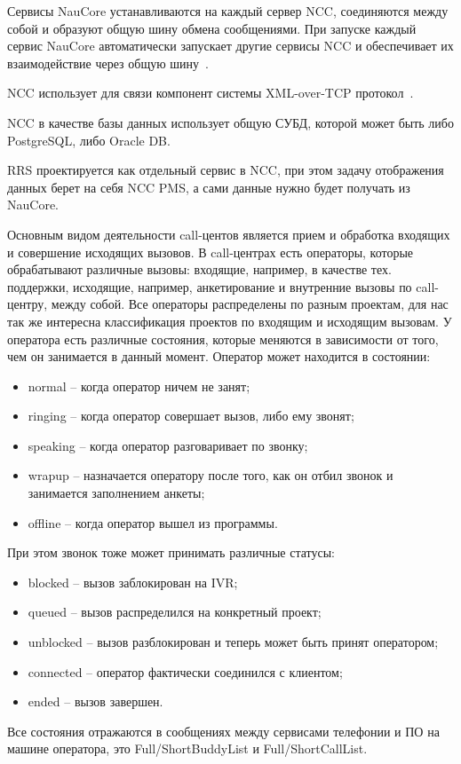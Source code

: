 Сервисы NauCore устанавливаются на каждый сервер NCC,
соединяются между собой и образуют общую шину обмена сообщениями.
При запуске каждый сервис NauCore автоматически запускает другие сервисы NCC
и обеспечивает их взаимодействие через общую шину~\cite{doc:core}.

NCC использует для связи компонент системы XML-over-TCP протокол~\cite{doc:portsndproto}.

NCC в качестве базы данных использует общую СУБД, которой может быть либо PostgreSQL, либо Oracle DB.

RRS проектируется как отдельный сервис в NCC,
при этом задачу отображения данных берет на себя NCC PMS,
а сами данные нужно будет получать из NauCore.

Основным видом деятельности call-центов является прием и обработка входящих и совершение исходящих вызовов.
В call-центрах есть операторы, которые обрабатывают различные вызовы: входящие, например, в качестве
тех. поддержки, исходящие, например, анкетирование и внутренние вызовы по call-центру,
между собой.
Все операторы распределены по разным проектам, для нас так же интересна классификация проектов по входящим и исходящим вызовам.
У оператора есть различные состояния, которые меняются в зависимости от того, чем он занимается в данный момент.
Оператор может находится в состоянии:
\begin{itemize}
    \item normal – когда оператор ничем не занят;
    \item ringing – когда оператор совершает вызов, либо ему звонят;
    \item speaking – когда оператор разговаривает по звонку;
    \item wrapup – назначается оператору после того, как он отбил звонок и занимается заполнением анкеты;
    \item offline – когда оператор вышел из программы.
\end{itemize}

При этом звонок тоже может принимать различные статусы:
\begin{itemize}
    \item blocked – вызов заблокирован на IVR;
    \item queued – вызов распределился на конкретный проект;
    \item unblocked – вызов разблокирован и теперь может быть принят оператором;
    \item connected – оператор фактически соединился с клиентом;
    \item ended – вызов завершен.
\end{itemize}
Все состояния отражаются в сообщениях между сервисами телефонии и ПО на машине оператора, это Full/ShortBuddyList и Full/ShortCallList.

